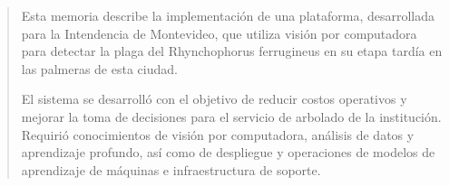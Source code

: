 \documentclass[
    11pt,
    spanish,
    singlespacing,
    parskip,
    headsepline,
    bookmarks=true,
    unicode=true,
    pdftoolbar=true,
    pdfmenubar=true,
    pdffitwindow=false,
    colorlinks=true,
    linkcolor=blue,
    citecolor=blue,
    urlcolor=blue
]{MastersDoctoralThesis}
\def\textbf#1{#1}%
\def\textit#1{#1}%
\begin{document}



\frontmatter %
\pagestyle{plain} %


\begin{abstract}
  \addchaptertocentry{\abstractname} %
  Esta memoria describe la implementación de una plataforma, desarrollada para la Intendencia de Montevideo, que utiliza visión por computadora para detectar la plaga del \textit{Rhynchophorus ferrugineus} en su etapa tardía en las palmeras de esta ciudad.

  El sistema se desarrolló con el objetivo de reducir costos operativos y mejorar la toma de decisiones para el servicio de arbolado de la institución. Requirió conocimientos de visión por computadora, análisis de datos y aprendizaje profundo, así como de despliegue y operaciones de modelos de aprendizaje de máquinas e infraestructura de soporte.
\end{abstract}




\tableofcontents
\listoffigures
\listoftables

\end{document}

